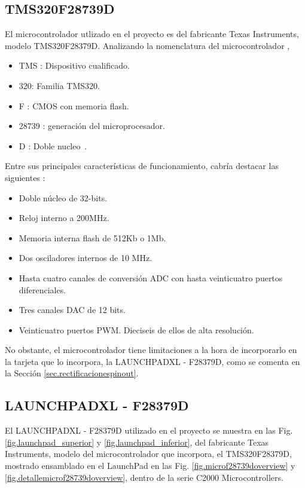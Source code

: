 \documentclass{report}
\begin{document}
\subsection{TMS320F28739D} \label{sec.TMS320F28739D}

El microcontrolador utlizado en el proyecto es del fabricante Texas Instruments, modelo TMS320F28379D. Analizando la nomenclatura del microcontrolador \cite{dieciseis},

\begin{itemize}
    \item TMS : Dispositivo cualificado.
    \item 320: Familia TMS320.
    \item F : CMOS con memoria flash.
    \item 28739 : generación del microprocesador.
    \item D : Doble nucleo \cite{diecisiete}.
\end{itemize}

Entre sus principales características de funcionamiento, cabría destacar las siguientes \cite{diecisiete}:
\begin{itemize}
    \item Doble núcleo de 32-bits.
    \item Reloj interno a 200MHz.
    \item Memoria interna flash de 512Kb o 1Mb.
    \item Dos osciladores internos de 10 MHz.
    \item Hasta cuatro canales de conversión ADC con hasta veinticuatro puertos diferenciales.
    \item Tres canales DAC de 12 bits.
    \item Veinticuatro puertos PWM. Dieciseis de ellos de alta resolución.
\end{itemize}

No obstante, el microcontrolador tiene limitaciones a la hora de incorporarlo en la tarjeta que lo incorpora, la LAUNCHPADXL - F28379D, como se comenta en la Sección \ref{sec.rectificacionespinout}.

\subsection{LAUNCHPADXL - F28379D} \label{sec.launchpad}

El LAUNCHPADXL - F28379D utilizado en el proyecto se muestra en las Fig. \ref{fig.launchpad_superior} y \ref{fig.launchpad_inferior}, del fabricante Texas Instruments, modelo del microcontrolador que incorpora, el TMS320F28379D, mostrado ensamblado en el LaunchPad en las Fig. \ref{fig.microf28739doverview} y \ref{fig.detallemicrof28739doverview}, dentro de la serie C2000 Microcontrollers.
\end{document}

